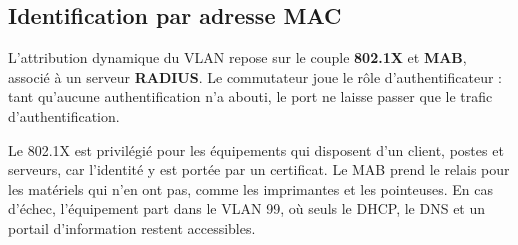 \documentclass[11pt,a4paper]{article}
\begin{document}
\subsection{Identification par adresse MAC}
L'attribution dynamique du VLAN repose sur le couple \textbf{802.1X} et \textbf{MAB}, associé à un serveur \textbf{RADIUS}. Le commutateur joue le rôle d'authentificateur : tant qu'aucune authentification n'a abouti, le port ne laisse passer que le trafic d'authentification.

Le 802.1X est privilégié pour les équipements qui disposent d'un client, postes et serveurs, car l'identité y est portée par un certificat. Le MAB prend le relais pour les matériels qui n'en ont pas, comme les imprimantes et les pointeuses. En cas d'échec, l'équipement part dans le VLAN 99, où seuls le DHCP, le DNS et un portail d'information restent accessibles.
\end{document}
